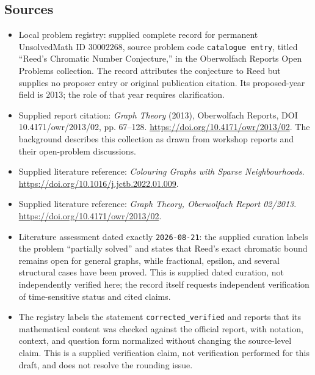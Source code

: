 \documentclass[11pt]{article}
\begin{document}
\subsection{Sources}
\begin{itemize}
\item Local problem registry: supplied complete record for permanent UnsolvedMath ID \(30002268\), source problem code \texttt{catalogue entry}, titled ``Reed's Chromatic Number Conjecture,'' in the Oberwolfach Reports Open Problems collection. The record attributes the conjecture to Reed but supplies no proposer entry or original publication citation. Its proposed-year field is \(2013\); the role of that year requires clarification.
\item Supplied report citation: \emph{Graph Theory} (2013), Oberwolfach Reports, DOI 10.4171/owr/2013/02, pp. 67--128. \url{https://doi.org/10.4171/owr/2013/02}. The background describes this collection as drawn from workshop reports and their open-problem discussions.
\item Supplied literature reference: \emph{Colouring Graphs with Sparse Neighbourhoods}. \url{https://doi.org/10.1016/j.jctb.2022.01.009}.
\item Supplied literature reference: \emph{Graph Theory, Oberwolfach Report 02/2013}. \url{https://doi.org/10.4171/owr/2013/02}.
\item Literature assessment dated exactly \texttt{2026-08-21}: the supplied curation labels the problem ``partially solved'' and states that Reed's exact chromatic bound remains open for general graphs, while fractional, epsilon, and several structural cases have been proved. This is supplied dated curation, not independently verified here; the record itself requests independent verification of time-sensitive status and cited claims.
\item The registry labels the statement \texttt{corrected\_verified} and reports that its mathematical content was checked against the official report, with notation, context, and question form normalized without changing the source-level claim. This is a supplied verification claim, not verification performed for this draft, and does not resolve the rounding issue.
\end{itemize}
\end{document}
